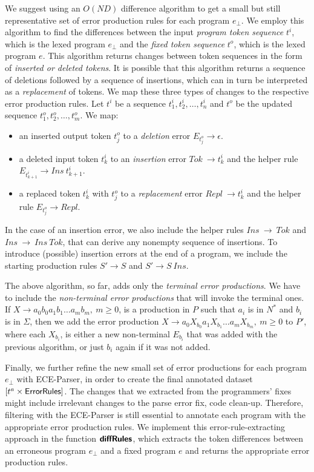 We suggest using an $O(ND)$ difference algorithm \citep{Myers_1986} to get a
small but still representative set of error production rules for each program
$e_{\bot}$. We employ this algorithm to find the differences between the input
\emph{program token sequence} $t^i$, which is the lexed program $e_{\bot}$ and
the \emph{fixed token sequence} $t^o$, which is the lexed program $e$. This
algorithm returns changes between token sequences in the form of \emph{inserted
or deleted tokens}. It is possible that this algorithm returns a sequence of
deletions followed by a sequence of insertions, which can in turn be interpreted
as a \emph{replacement} of tokens. We map these three types of changes to the
respective error production rules. Let $t^i$ be a sequence $t^i_1, t^i_2, \dots,
t^i_n$ and $t^o$ be the updated sequence $t^o_1, t^o_2, \dots, t^o_m$. We map:
\begin{itemize}
    \item an inserted output token $t^o_j$ to a \emph{deletion} error $E_{t^o_j}
    \rightarrow \epsilon$.
    \item a deleted input token $t^i_k$ to an \emph{insertion} error $Tok\
    \rightarrow t^i_k$ and the helper rule $E_{t^i_{k+1}} \rightarrow Ins\
    t^i_{k+1}$.
    \item a replaced token $t^i_k$ with $t^o_j$ to a \emph{replacement} error
    $Repl\ \rightarrow t^i_k$ and the helper rule $E_{t^o_j} \rightarrow Repl$.
\end{itemize}

In the case of an insertion error, we also include the helper rules $Ins\
\rightarrow\ Tok$ and $Ins\ \rightarrow\ Ins\ Tok$, that can derive any nonempty
sequence of insertions. To introduce (possible) insertion errors at the end of a
program, we include the starting production rules $S' \rightarrow S$ and $S'
\rightarrow S\ Ins$.

The above algorithm, so far, adds only the \emph{terminal error productions}. We
have to include the \emph{non-terminal error productions} that will invoke the
terminal ones. If $X \rightarrow a_0b_0a_1b_1 \dots a_mb_m,\ m \geq 0$, is a
production in $P$ such that $a_i$ is in $N^*$ and $b_i$ is in $\Sigma$, then we
add the error production $X \rightarrow a_0X_{b_0}a_1X_{b_1} \dots a_mX_{b_m},\
m \geq 0$ to $P'$, where each $X_{b_i}$, is either a new non-terminal $E_{b_i}$
that was added with the previous algorithm, or just $b_i$ again if it was not
added.

Finally, we further refine the new small set of error productions for each
program $e_{\bot}$ with ECE-Parser, in order to create the final annotated
dataset $[t^a \times \mathsf{ErrorRules}]$. The changes that we extracted from
the programmers' fixes might include irrelevant changes to the parse error fix,
\eg code clean-up. Therefore, filtering with the ECE-Parser is still essential
to annotate each program with the appropriate error production rules. We
implement this error-rule-extracting approach in the function $\bm{\mathsf{diffRules}}$, which
extracts the token differences between an erroneous program $e_{\bot}$ and a
fixed program $e$ and returns the appropriate error production rules.


